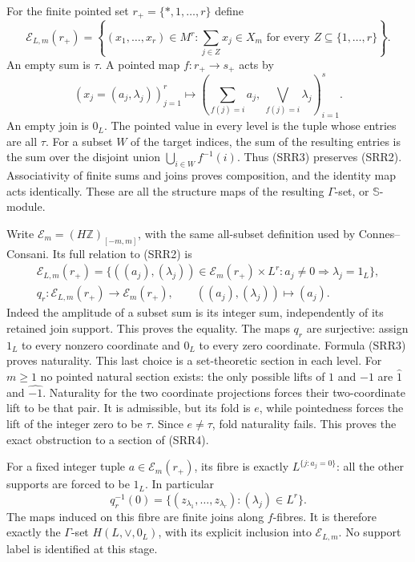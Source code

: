 For the finite pointed set $r_+=\{*,1,\ldots,r\}$ define
\begin{equation}\tag{SRR2}
 \mathcal E_{L,m}(r_+)=
 \left\{(x_1,\ldots,x_r)\in M^r:
           \sum_{j\in Z}x_j\in X_m\text{ for every }
                    Z\subseteq\{1,\ldots,r\}\right\}.
\end{equation}
An empty sum is $\tau$. A pointed map $f:r_+\to s_+$ acts by
\begin{equation}\tag{SRR3}
 (x_j=(a_j,\lambda_j))_{j=1}^r\longmapsto
 \left(\sum_{f(j)=i}a_j,\ \bigvee_{f(j)=i}\lambda_j\right)_{i=1}^s.
\end{equation}
An empty join is $0_L$. The pointed value in every level is the tuple
whose entries are all $\tau$. For a subset $W$ of the target indices,
the sum of the resulting entries is the sum over the disjoint union
$\bigcup_{i\in W}f^{-1}(i)$. Thus (SRR3) preserves (SRR2).
Associativity of finite sums and joins proves composition, and the
identity map acts identically. These are all the structure maps of the
resulting $\Gamma$-set, or $\mathbb S$-module.

Write
$\mathcal E_m=(H\mathbb Z)_{[-m,m]}$, with the same all-subset
definition used by Connes--Consani. Its full relation to (SRR2) is
\begin{equation}\tag{SRR4}
 \begin{split}
 \mathcal E_{L,m}(r_+)
 =\{((a_j),(\lambda_j))\in\mathcal E_m(r_+)\times L^r:
                  a_j\ne0\Longrightarrow\lambda_j=1_L\},\\
 q_r:\mathcal E_{L,m}(r_+)\longrightarrow\mathcal E_m(r_+),
             \qquad ((a_j),(\lambda_j))\longmapsto(a_j).
 \end{split}
\end{equation}
Indeed the amplitude of a subset sum is its integer sum, independently
of its retained join support. This proves the equality. The maps $q_r$
are surjective: assign $1_L$ to every nonzero coordinate and $0_L$ to
every zero coordinate. Formula (SRR3) proves naturality. This last
choice is a set-theoretic section in each level. For $m\ge1$ no
pointed natural section exists: the only possible lifts of $1$ and $-1$
are $\widehat1$ and $\widehat{-1}$. Naturality for the two coordinate
projections forces their two-coordinate lift to be that pair. It is
admissible, but its fold is $e$, while pointedness forces the lift of
the integer zero to be $\tau$. Since $e\ne\tau$, fold naturality
fails. This proves the exact obstruction to a section of (SRR4).

For a fixed integer tuple $a\in\mathcal E_m(r_+)$, its fibre is
exactly $L^{\{j:a_j=0\}}$: all the other supports are forced to be
$1_L$. In particular
\begin{equation}\tag{SRR5}
 q_r^{-1}(0)=\{(z_{\lambda_1},\ldots,z_{\lambda_r}):
                                     (\lambda_j)\in L^r\}.
\end{equation}
The maps induced on this fibre are finite joins along $f$-fibres.
It is therefore exactly the $\Gamma$-set $H(L,\vee,0_L)$, with its
explicit inclusion into $\mathcal E_{L,m}$. No support label is
identified at this stage.

